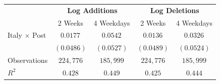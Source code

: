 \begin{tabular}{l|cc|cc}
\hline \hline
 & \multicolumn{2}{c|}{\textbf{Log Additions}} & \multicolumn{2}{c}{\textbf{Log Deletions}} \\
 & 2 Weeks & 4 Weekdays & 2 Weeks & 4 Weekdays \\
\hline
Italy $\times$ Post & $0.0177^{}$ & $0.0542^{}$ & $0.0136^{}$ & $0.0326^{}$ \\
 & $(0.0486)$ & $(0.0527)$ & $(0.0489)$ & $(0.0524)$ \\
\hline
Observations & $224,776$ & $185,999$ & $224,776$ & $185,999$ \\
$R^2$ & $0.428$ & $0.449$ & $0.425$ & $0.444$ \\
\hline \hline
\end{tabular}
